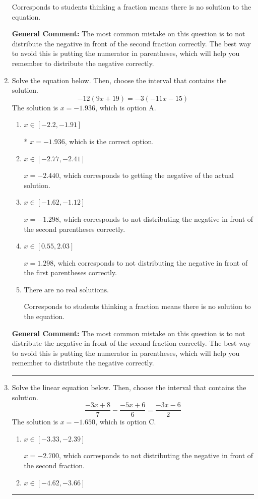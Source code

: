 \documentclass{extbook}[14pt]
\newcommand{\litem}[1]{\item #1

\rule{\textwidth}{0.4pt}}
\begin{document}
\begin{enumerate}
{\begin{enumerate}[label=\Alph*.]
Corresponds to students thinking a fraction means there is no solution to the equation.
\end{enumerate}

\textbf{General Comment:} The most common mistake on this question is to not distribute the negative in front of the second fraction correctly. The best way to avoid this is putting the numerator in parentheses, which will help you remember to distribute the negative correctly.
}
\litem{
Solve the equation below. Then, choose the interval that contains the solution.
\[ -12(9x + 19) = -3(-11x -15) \]
The solution is \( x = -1.936 \), which is option A.\begin{enumerate}[label=\Alph*.]
\item \( x \in [-2.2, -1.91] \)

* $x = -1.936$, which is the correct option.
\item \( x \in [-2.77, -2.41] \)

$x = -2.440$, which corresponds to getting the negative of the actual solution.
\item \( x \in [-1.62, -1.12] \)

$x = -1.298$, which corresponds to not distributing the negative in front of the second parentheses correctly.
\item \( x \in [0.55, 2.03] \)

$x = 1.298$, which corresponds to not distributing the negative in front of the first parentheses correctly.
\item \( \text{There are no real solutions.} \)

Corresponds to students thinking a fraction means there is no solution to the equation.
\end{enumerate}

\textbf{General Comment:} The most common mistake on this question is to not distribute the negative in front of the second fraction correctly. The best way to avoid this is putting the numerator in parentheses, which will help you remember to distribute the negative correctly.
}
\litem{
Solve the linear equation below. Then, choose the interval that contains the solution.
\[ \frac{-3x + 8}{7} - \frac{-5x + 6}{6} = \frac{-3x -6}{2} \]
The solution is \( x = -1.650 \), which is option C.\begin{enumerate}[label=\Alph*.]
\item \( x \in [-3.33, -2.39] \)

 $x = -2.700$, which corresponds to not distributing the negative in front of the second fraction.
\item \( x \in [-4.62, -3.66] \)


\end{enumerate}}
\end{enumerate}
\end{document}
